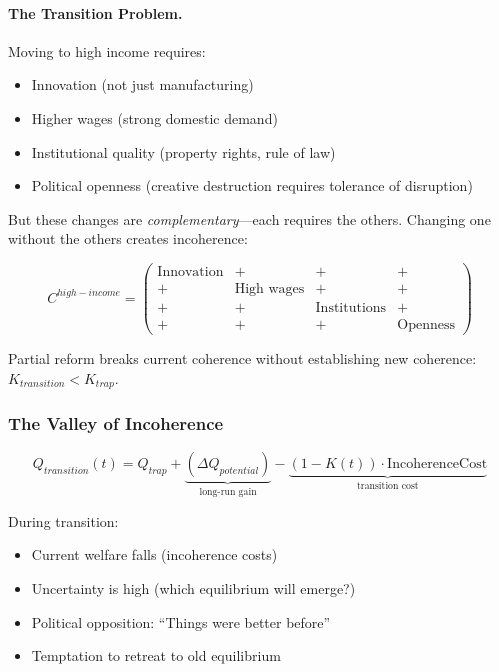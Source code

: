 \paragraph{The Transition Problem.}
Moving to high income requires:
\begin{itemize}
  \item Innovation (not just manufacturing)
  \item Higher wages (strong domestic demand)
  \item Institutional quality (property rights, rule of law)
  \item Political openness (creative destruction requires tolerance of disruption)
\end{itemize}

But these changes are \emph{complementary}---each requires the others.
Changing one without the others creates incoherence:

\begin{equation}
C^{high-income} = \begin{pmatrix}
\text{Innovation} & + & + & + \\
+ & \text{High wages} & + & + \\
+ & + & \text{Institutions} & + \\
+ & + & + & \text{Openness}
\end{pmatrix}
\end{equation}

Partial reform breaks current coherence without establishing new coherence:
$K_{transition} < K_{trap}$.

\subsubsection{The Valley of Incoherence}

\begin{equation}
Q_{transition}(t) = Q_{trap} + \underbrace{(\Delta Q_{potential})}_{\text{long-run gain}} - \underbrace{(1 - K(t)) \cdot \text{IncoherenceCost}}_{\text{transition cost}}
\end{equation}

During transition:
\begin{itemize}
  \item Current welfare falls (incoherence costs)
  \item Uncertainty is high (which equilibrium will emerge?)
  \item Political opposition: ``Things were better before''
  \item Temptation to retreat to old equilibrium
\end{itemize}

